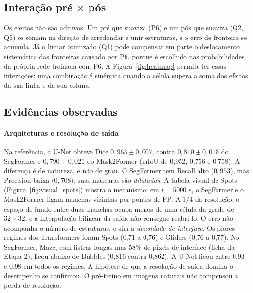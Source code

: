 \subsection{Interação pré $\times$ pós}
Os efeitos não são aditivos. Um pré que suaviza (P6) e um pós que suaviza (Q2, Q5) se somam na
direção de arredondar e unir estruturas, e o erro de fronteira se acumula. Já o limiar otimizado
(Q1) pode compensar em parte o deslocamento sistemático das fronteiras causado por P6, porque é
escolhido nas probabilidades da própria rede treinada com P6. A Figura~\ref{fig:heatmap} permite
ler essas interações: uma combinação é sinérgica quando a célula supera a soma dos efeitos da sua
linha e da sua coluna.

\subsection{Evidências observadas}

\paragraph{Arquiteturas e resolução de saída} Na referência, a U-Net obteve Dice
$0{,}963\pm0{,}007$, contra $0{,}810\pm0{,}018$ do SegFormer e $0{,}790\pm0{,}021$ do Mask2Former
(mIoU de 0,952, 0,756 e 0,758). A diferença é de natureza, e não de grau. O SegFormer tem Recall
alto ($0{,}953$), mas Precision baixa ($0{,}708$): suas máscaras são \emph{dilatadas}. A tabela
visual de Spots (Figura~\ref{fig:visual_spots}) mostra o mecanismo: em $t=5000$ s, o SegFormer e o
Mask2Former ligam manchas vizinhas por pontes de FP. A $1/4$ da resolução, o espaço de fundo entre
duas manchas ocupa menos de uma célula da grade de $32\times32$, e a interpolação bilinear da saída
não consegue reabri-lo. O erro não acompanha o número de estruturas, e sim a \emph{densidade de
interface}. Os piores regimes dos Transformers foram Spots (0,71 a 0,76) e Gliders (0,76 a 0,77).
No SegFormer, Maze, com listras longas mas 58\% de pixels de interface (ficha da Etapa 2),
ficou abaixo de Bubbles (0,816 contra 0,862). A U-Net ficou entre 0,93 e 0,98 em todos os regimes. A
hipótese de que a resolução de saída domina o desempenho se confirmou. O pré-treino em imagens
naturais não compensou a perda de resolução.


